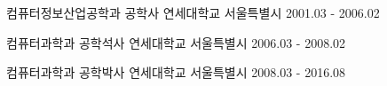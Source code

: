 


\begin{cventries}

  \cventry
    {컴퓨터정보산업공학과 공학사} %
    {연세대학교} %
    {서울특별시} %
    {2001.03 - 2006.02} %
    {}


  \cventry
    {컴퓨터과학과 공학석사} %
    {연세대학교} %
    {서울특별시} %
    {2006.03 - 2008.02} %
    {
    }

  \cventry
    {컴퓨터과학과 공학박사} %
    {연세대학교} %
    {서울특별시} %
    {2008.03 - 2016.08} %
    {
    }
\end{cventries}
